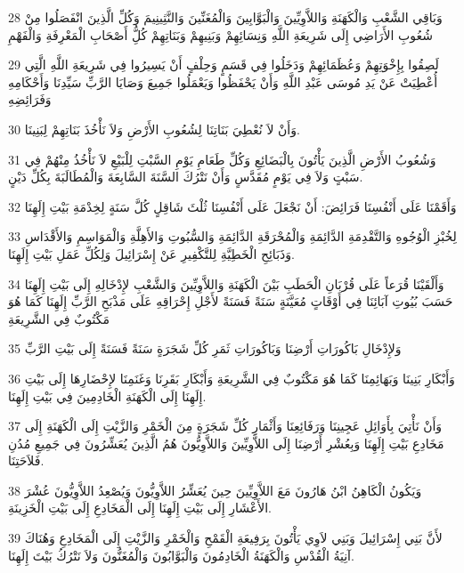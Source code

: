 \par 28 وَبَاقِي الشَّعْبِ وَالْكَهَنَةِ وَاللاَّوِيِّينَ وَالْبَوَّابِينَ وَالْمُغَنِّينَ وَالنَّثِينِيمَ وَكُلِّ الَّذِينَ انْفَصَلُوا مِنْ شُعُوبِ الأَرَاضِي إِلَى شَرِيعَةِ اللَّهِ وَنِسَائِهِمْ وَبَنِيهِمْ وَبَنَاتِهِمْ كُلُِّ أَصْحَابِ الْمَعْرِفَةِ وَالْفَهْمِ
\par 29 لَصِقُوا بِإِخْوَتِهِمْ وَعُظَمَائِهِمْ وَدَخَلُوا فِي قَسَمٍ وَحِلْفٍ أَنْ يَسِيرُوا فِي شَرِيعَةِ اللَّهِ الَّتِي أُعْطِيَتْ عَنْ يَدِ مُوسَى عَبْدِ اللَّهِ وَأَنْ يَحْفَظُوا وَيَعْمَلُوا جَمِيعَ وَصَايَا الرَّبِّ سَيِّدِنَا وَأَحْكَامِهِ وَفَرَائِضِهِ
\par 30 وَأَنْ لاَ نُعْطِيَ بَنَاتِنَا لِشُعُوبِ الأَرْضِ وَلاَ نَأْخُذَ بَنَاتِهِمْ لِبَنِينَا.
\par 31 وَشُعُوبُ الأَرْضِ الَّذِينَ يَأْتُونَ بِالْبَضَائِعِ وَكُلِّ طَعَامِ يَوْمِ السَّبْتِ لِلْبَيْعِ لاَ نَأْخُذُ مِنْهُمْ فِي سَبْتٍ وَلاَ فِي يَوْمٍ مُقَدَّسٍ وَأَنْ نَتْرُكَ السَّنَةَ السَّابِعَةَ وَالْمُطَالَبَةَ بِكُلِّ دَيْنٍ.
\par 32 وَأَقَمْنَا عَلَى أَنْفُسِنَا فَرَائِضَ: أَنْ نَجْعَلَ عَلَى أَنْفُسِنَا ثُلْثَ شَاقِلٍ كُلَّ سَنَةٍ لِخِدْمَةِ بَيْتِ إِلَهِنَا
\par 33 لِخُبْزِ الْوُجُوهِ وَالتَّقْدِمَةِ الدَّائِمَةِ وَالْمُحْرَقَةِ الدَّائِمَةِ وَالسُّبُوتِ وَالأَهِلَّةِ وَالْمَوَاسِمِ وَالأَقْدَاسِ وَذَبَائِحِ الْخَطِيَّةِ لِلتَّكْفِيرِ عَنْ إِسْرَائِيلَ وَلِكُلِّ عَمَلِ بَيْتِ إِلَهِنَا.
\par 34 وَأَلْقَيْنَا قُرَعاً عَلَى قُرْبَانِ الْحَطَبِ بَيْنَ الْكَهَنَةِ وَاللاَّوِيِّينَ وَالشَّعْبِ لإِدْخَالِهِ إِلَى بَيْتِ إِلَهِنَا حَسَبَ بُيُوتِ آبَائِنَا فِي أَوْقَاتٍ مُعَيَّنَةٍ سَنَةً فَسَنَةً لأَجْلِ إِحْرَاقِهِ عَلَى مَذْبَحِ الرَّبِّ إِلَهِنَا كَمَا هُوَ مَكْتُوبٌ فِي الشَّرِيعَةِ
\par 35 وَلإِدْخَالِ بَاكُورَاتِ أَرْضِنَا وَبَاكُورَاتِ ثَمَرِ كُلِّ شَجَرَةٍ سَنَةً فَسَنَةً إِلَى بَيْتِ الرَّبِّ
\par 36 وَأَبْكَارِ بَنِينَا وَبَهَائِمِنَا كَمَا هُوَ مَكْتُوبٌ فِي الشَّرِيعَةِ وَأَبْكَارِ بَقَرِنَا وَغَنَمِنَا لإِحْضَارِهَا إِلَى بَيْتِ إِلَهِنَا إِلَى الْكَهَنَةِ الْخَادِمِينَ فِي بَيْتِ إِلَهِنَا.
\par 37 وَأَنْ نَأْتِيَ بِأَوَائِلِ عَجِينِنَا وَرَفَائِعِنَا وَأَثْمَارِ كُلِّ شَجَرَةٍ مِنَ الْخَمْرِ وَالزَّيْتِ إِلَى الْكَهَنَةِ إِلَى مَخَادِعِ بَيْتِ إِلَهِنَا وَبِعُشْرِ أَرْضِنَا إِلَى اللاَّوِيِّينَ وَاللاَّوِيُّونَ هُمُ الَّذِينَ يُعَشِّرُونَ فِي جَمِيعِ مُدُنِ فَلاَحَتِنَا.
\par 38 وَيَكُونُ الْكَاهِنُ ابْنُ هَارُونَ مَعَ اللاَّوِيِّينَ حِينَ يُعَشِّرُ اللاَّوِيُّونَ وَيُصْعِدُ اللاَّوِيُّونَ عُشْرَ الأَعْشَارِ إِلَى بَيْتِ إِلَهِنَا إِلَى الْمَخَادِعِ إِلَى بَيْتِ الْخَزِينَةِ.
\par 39 لأَنَّ بَنِي إِسْرَائِيلَ وَبَنِي لاَوِي يَأْتُونَ بِرَفِيعَةِ الْقَمْحِ وَالْخَمْرِ وَالزَّيْتِ إِلَى الْمَخَادِعِ وَهُنَاكَ آنِيَةُ الْقُدْسِ وَالْكَهَنَةُ الْخَادِمُونَ وَالْبَوَّابُونَ وَالْمُغَنُّونَ وَلاَ نَتْرُكُ بَيْتَ إِلَهِنَا.

